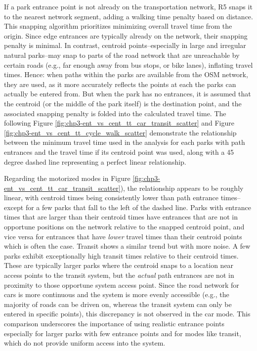 \documentclass[
11pt, %
oneside, %
english, %
singlespacing, %
]{macthesis} %
\begin{document}
If a park entrance point is not already on the transportation network, R5 snaps it to the nearest network segment, adding a walking time penalty based on distance. This snapping algorithm prioritizes minimizing overall travel time from the origin. Since edge entrances are typically already on the network, their snapping penalty is minimal. In contrast, centroid points--especially in large and irregular natural parks--may snap to parts of the road network that are unreachable by certain roads (e.g., far enough away from bus stops, or bike lanes), inflating travel times. Hence: when paths within the parks are available from the OSM network, they are used, as it more accurately reflects the points at each the parks can actually be entered from. But when the park has no entrances, it is assumed that the centroid (or the middle of the park itself) is the destination point, and the associated snapping penalty is folded into the calculated travel time. The following Figure \ref{fig:chp3-ent_vs_cent_tt_car_transit_scatter} and Figure \ref{fig:chp3-ent_vs_cent_tt_cycle_walk_scatter} demonstrate the relationship between the minimum travel time used in the analysis for each parks with path entrances and the travel time if its centroid point was used, along with a 45 degree dashed line representing a perfect linear relationship.

Regarding the motorized modes in Figure \ref{fig:chp3-ent_vs_cent_tt_car_transit_scatter}), the relationship appears to be roughly linear, with centroid times being consistently lower than path entrance times--except for a few parks that fall to the left of the dashed line. Parks with entrance times that are larger than their centroid times have entrances that are not in opportune positions on the network relative to the snapped centroid point, and vice versa for entrances that have \emph{lower} travel times than their centroid points which is often the case. Transit shows a similar trend but with more noise. A few parks exhibit exceptionally high transit times relative to their centroid times. These are typically larger parks where the centroid snaps to a location near access points to the transit system, but the \emph{actual} path entrances are not in proximity to those opportune system access point. Since the road network for cars is more continuous and the system is more evenly accessible (e.g., the majority of roads can be driven on, whereas the transit system can only be entered in specific points), this discrepancy is not observed in the car mode. This comparison underscores the importance of using realistic entrance points especially for larger parks with few entrance points and for modes like transit, which do not provide uniform access into the system.
\end{document}
